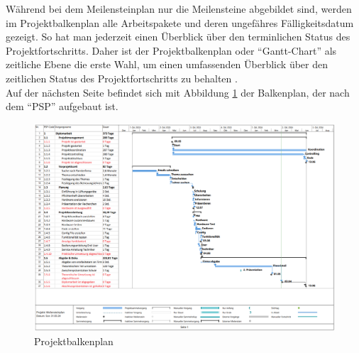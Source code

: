 Während bei dem Meilensteinplan nur die Meilensteine abgebildet sind, werden im Projektbalkenplan alle Arbeitspakete und deren ungefähres Fälligkeitsdatum gezeigt. So hat man jederzeit einen Überblick über den terminlichen Status des Projektfortschritts. Daher ist der Projektbalkenplan oder \enquote{Gantt-Chart}  als zeitliche Ebene die erste Wahl, um einen umfassenden Überblick über den zeitlichen Status des Projektfortschritts zu behalten \cite[vgl.][]{domendos:2019}. \\
Auf der nächsten Seite befindet sich mit Abbildung \ref{fig:projektbalkenplan} der Balkenplan, der nach dem \enquote{PSP} aufgebaut ist.

\begin{landscape}
	\begin{figure}[H]
		\centering
		\includegraphics[width=0.9\linewidth]{Bilder/ganttchart}
		\caption{Projektbalkenplan}
		\label{fig:projektbalkenplan}
	\end{figure}
\end{landscape}